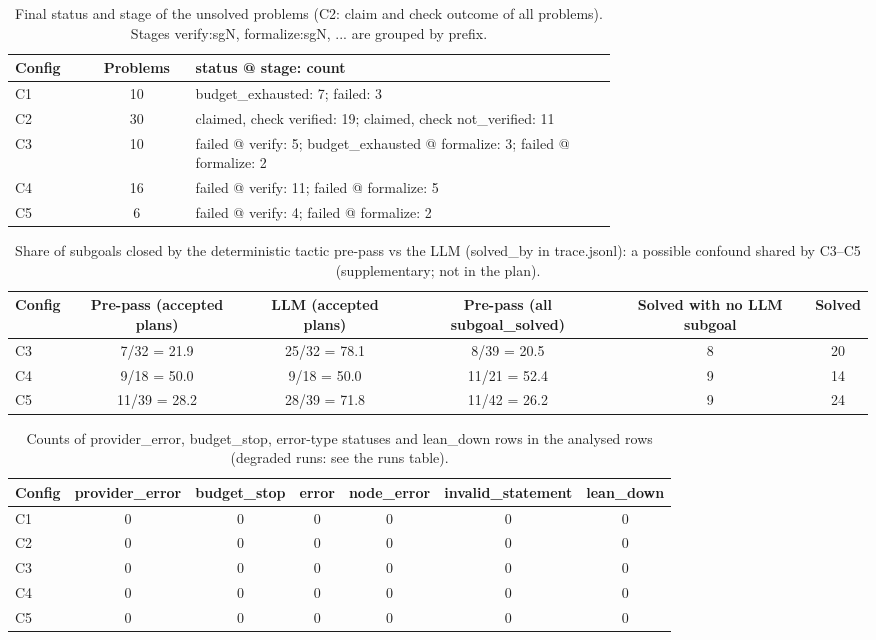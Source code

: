 \begin{table}[t]
\centering
\scriptsize
\setlength{\tabcolsep}{3pt}
\caption{Final status and stage of the unsolved problems (C2: claim and check outcome of all problems). Stages verify:sgN, formalize:sgN, ... are grouped by prefix.}
\label{tab:final-fail}
\begin{tabular}{lcp{0.7\linewidth}}
\toprule
Config & Problems & status @ stage: count \\
\midrule
C1 & 10 & budget\_exhausted: 7; failed: 3 \\
C2 & 30 & claimed, check verified: 19; claimed, check not\_verified: 11 \\
C3 & 10 & failed @ verify: 5; budget\_exhausted @ formalize: 3; failed @ formalize: 2 \\
C4 & 16 & failed @ verify: 11; failed @ formalize: 5 \\
C5 & 6 & failed @ verify: 4; failed @ formalize: 2 \\
\bottomrule
\end{tabular}
\end{table}

\begin{table}[t]
\centering
\scriptsize
\setlength{\tabcolsep}{3pt}
\caption{Share of subgoals closed by the deterministic tactic pre-pass vs the LLM (solved\_by in trace.jsonl): a possible confound shared by C3--C5 (supplementary; not in the plan).}
\label{tab:prepass}
\begin{tabular}{lccccc}
\toprule
Config & Pre-pass (accepted plans) & LLM (accepted plans) & Pre-pass (all subgoal\_solved) & Solved with no LLM subgoal & Solved \\
\midrule
C3 & 7/32 = 21.9 & 25/32 = 78.1 & 8/39 = 20.5 & 8 & 20 \\
C4 & 9/18 = 50.0 & 9/18 = 50.0 & 11/21 = 52.4 & 9 & 14 \\
C5 & 11/39 = 28.2 & 28/39 = 71.8 & 11/42 = 26.2 & 9 & 24 \\
\bottomrule
\end{tabular}
\end{table}

\begin{table}[t]
\centering
\scriptsize
\setlength{\tabcolsep}{3pt}
\caption{Counts of provider\_error, budget\_stop, error-type statuses and lean\_down rows in the analysed rows (degraded runs: see the runs table).}
\label{tab:infra}
\begin{tabular}{lcccccc}
\toprule
Config & provider\_error & budget\_stop & error & node\_error & invalid\_statement & lean\_down \\
\midrule
C1 & 0 & 0 & 0 & 0 & 0 & 0 \\
C2 & 0 & 0 & 0 & 0 & 0 & 0 \\
C3 & 0 & 0 & 0 & 0 & 0 & 0 \\
C4 & 0 & 0 & 0 & 0 & 0 & 0 \\
C5 & 0 & 0 & 0 & 0 & 0 & 0 \\
\bottomrule
\end{tabular}
\end{table}

